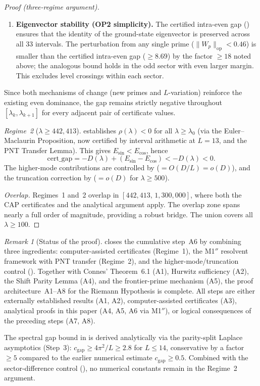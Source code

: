 \documentclass[12pt,a4paper]{article}
\theoremstyle{definition}
\theoremstyle{remark}
\newtheorem{remark}[theorem]{Remark}
\begin{document}
\begin{proof}[Proof (three-regime argument)]
\begin{enumerate}[label=(\roman*)]
  \item \textbf{Eigenvector stability (OP2 simplicity).}
    The certified intra-even gap () ensures that the identity of the ground-state eigenvector is preserved across all $33$ intervals.
    The perturbation from any single prime ($\|W_p\|_{\mathrm{op}} < 0.46$) is smaller than the certified intra-even gap ($\geq 8.69$) by the factor $\geq 18$ noted above; the analogous bound holds in the odd sector with even larger margin.
    This excludes level crossings within each sector.
\end{enumerate}

\noindent Since both mechanisms of change (new primes and $L$-variation) reinforce the existing even dominance, the gap remains strictly negative throughout $[\lambda_k, \lambda_{k+1}]$ for every adjacent pair of certificate values.

\emph{Regime~2} ($\lambda \geq 442{,}413$).  establishes $\rho(\lambda) < 0$ for all $\lambda \geq \lambda_0$ (via the Euler--Maclaurin Proposition, now certified by interval arithmetic at $L = 13$, and the PNT Transfer Lemma). This gives $E_{\sin} < E_{\cos}$, hence
\[
  \mathrm{cert\_gap} = -D(\lambda) + (E_{\sin} - E_{\cos}) < -D(\lambda) < 0.
\]
The higher-mode contributions are controlled by  ($= O(D/L) = o(D)$), and the truncation correction by  ($= o(D)$ for $\lambda \geq 500$).

\emph{Overlap.} Regimes~1 and~2 overlap in $[442{,}413,\, 1{,}300{,}000]$, where both the CAP certificates and the analytical argument apply. The overlap zone spans nearly a full order of magnitude, providing a robust bridge. The union covers all $\lambda \geq 100$.
\end{proof}

\begin{remark}[Status of the proof]
\label{rem:M1-status}
 closes the cumulative step~A6 by combining three ingredients: computer-assisted certificates (Regime~1), the M1$''$ resolvent framework with PNT transfer (Regime~2), and the higher-mode/truncation control (). Together with Connes' Theorem~6.1 (A1), Hurwitz sufficiency (A2), the Shift Parity Lemma (A4), and the frontier-prime mechanism (A5), the proof architecture~A1--A8 for the Riemann Hypothesis is complete. All steps are either externally established results (A1, A2), computer-assisted certificates (A3), analytical proofs in this paper (A4, A5, A6 via M1$''$), or logical consequences of the preceding steps (A7, A8).

The spectral gap bound in  is derived analytically via the parity-split Laplace asymptotics (Step~3): $c_{\mathrm{gap}} \geq 4\pi^2/L \geq 2.8$ for $L \leq 14$, conservative by a factor $\geq 5$ compared to the earlier numerical estimate $c_{\mathrm{gap}} \geq 0.5$. Combined with the sector-difference control (), no numerical constants remain in the Regime~2 argument.
\end{remark}
\end{document}

